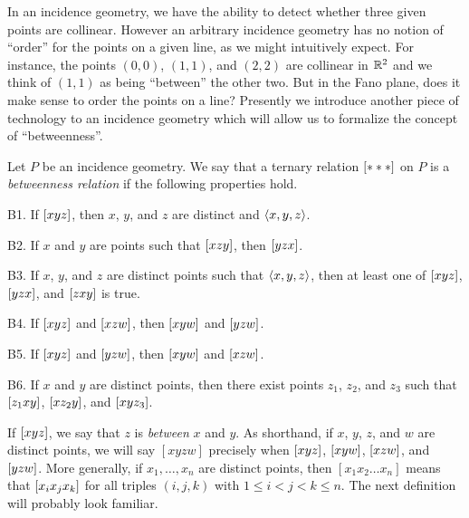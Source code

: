 In an incidence geometry, we have the ability to detect whether three given points are collinear.
However an arbitrary incidence geometry has no notion of ``order'' for the points on a given line, as we might intuitively expect.
For instance, the points \((0,0)\), \((1,1)\), and \((2,2)\) are collinear in \(\mathbb{R}^2\) and we think of \((1,1)\) as being ``between'' the other two.
But in the Fano plane, does it make sense to order the points on a line?
Presently we introduce another piece of technology to an incidence geometry which will allow us to formalize the concept of ``betweenness''.

\begin{dfn}[Betweenness]
Let \(P\) be an incidence geometry.
We say that a ternary relation \([ \ast \ast \ast ]\) on \(P\) is a \emph{betweenness relation} if the following properties hold.
\begin{proplist}
\item[B1.] If \([ x y z ]\), then \(x\), \(y\), and \(z\) are distinct and \(\langle x, y, z \rangle\).
\item[B2.] If \(x\) and \(y\) are points such that \([ x z y ]\), then \([ y z x ]\).
\item[B3.] If \(x\), \(y\), and \(z\) are distinct points such that \(\langle x, y, z \rangle\), then at least one of \([ x y z ]\), \([ y z x ]\), and \([ z x y ]\) is true.
\item[B4.] If \([ x y z ]\) and \([ x z w ]\), then \([ x y w ]\) and \([ y z w ]\).
\item[B5.] If \([ x y z ]\) and \([ y z w ]\), then \([ x y w ]\) and \([ x z w ]\).
\item[B6.] If \(x\) and \(y\) are distinct points, then there exist points \(z_1\), \(z_2\), and \(z_3\) such that \([ z_1 x y ]\), \([ x z_2 y ]\), and \([ x y z_3 ]\).
\end{proplist}
\end{dfn}

If \([ x y z ]\), we say that \(z\) is \emph{between} \(x\) and \(y\).
As shorthand, if \(x\), \(y\), \(z\), and \(w\) are distinct points, we will say \([xyzw]\) precisely when \([ x y z ]\), \([ x y w ]\), \([ x z w ]\), and \([ y z w ]\).
More generally, if \(x_1, \ldots, x_n\) are distinct points, then \([x_1x_2 \ldots x_n]\) means that \([ x_i x_j x_k ]\) for all triples \((i,j,k)\) with \(1 \leq i < j < k \leq n\).
The next definition will probably look familiar.

